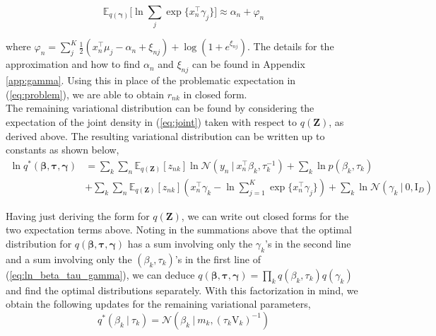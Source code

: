 \documentclass[twoside,11pt]{article}
\newcommand{\tr}{\intercal}
\newcommand{\eye}{\mathrm{I}}
\newcommand\given[1][]{\:#1\vert\:}
\newcommand{\transpose}[1]{#1^{\intercal}}
\newcommand{\kprod}{\prod\limits_{k}}
\newcommand{\nsum}{\sum\limits_{n}}
\newcommand{\ksum}{\sum\limits_{k}}
\newcommand{\boldbeta}{\boldsymbol\beta}
\newcommand{\boldgamma}{\boldsymbol\gamma}
\newcommand{\boldtau}{\boldsymbol\tau}
\newcommand{\sumexp}{\sum_{j=1}^{K} \exp \{ \transpose{x_n} \gamma_j \}}
\newcommand{\E}{\mathbb{E}}
\newcommand{\pr}[1]{p \left( #1 \right)}
\begin{document}
\begin{equation} \label{eq:bouchard_approx}
	\E_{q(\boldsymbol\gamma)}\big[\ln \sum_{j} \exp \{ x_n^{\tr} \gamma_j \} \big] \approx \alpha_n + \varphi_n
\end{equation}

where $\varphi_n =  \sum\limits_{j}^K \frac{1}{2}\left(x_n^{\tr}\mu_j - \alpha_n + \xi_{nj}\right) + \log( 1 + e^{\xi_{nj}})$. The details for the approximation and how to find $\alpha_n$ and $\xi_{nj}$ can be found in Appendix \ref{app:gamma}. Using this in place of the problematic expectation in (\ref{eq:problem}), we are able to obtain $r_{nk}$ in closed form. \\

The remaining variational distribution can be found by considering the expectation of the joint density in (\ref{eq:joint}) taken with respect to $q(\mathbf{Z})$, as derived above. The resulting variational distribution can be written up to constants as shown below,
\begin{equation} \label{eq:ln_beta_tau_gamma}
\begin{split}
	\ln q^{*}(\boldbeta, \boldtau, \boldgamma) &=  \ksum \nsum  \E_{q(\mathbf{Z})}[z_{nk}] \ln \mathcal{N} \left( y_n \given \transpose{x_n} \beta_k, \tau_{k}^{-1} \right) + \ksum \ln \pr{\beta_k, \tau_k} \\
	& + \ksum \nsum \E_{q(\mathbf{Z})}[z_{nk}] \left( \transpose{x_n} \gamma_k - \ln  \sumexp \right) + \ksum \ln \mathcal{N}(\gamma_k \given 0, \eye_D)
\end{split}
\end{equation}

Having just deriving the form for $q(\mathbf{Z})$, we can write out closed forms for the two expectation terms above. Noting in the summations above that the optimal distribution for $q(\boldbeta, \boldtau, \boldgamma)$ has a sum involving only the $\gamma_k$'s in the second line and a sum involving only the $(\beta_k, \tau_k)$'s in the first line of (\ref{eq:ln_beta_tau_gamma}), we can deduce $q(\boldbeta, \boldtau, \boldgamma) = \kprod q(\beta_k, \tau_k) q(\gamma_k)$ and find the optimal distributions separately. With this factorization in mind, we obtain the following updates for the remaining variational parameters,
\begin{equation} \label{optimal_beta_given_tau}
	q^{*}(\beta_k \given \tau_k) = \mathcal{N}\left(\beta_k \given m_k, (\tau_k \mathrm{V}_k)^{-1} \right)
\end{equation}
\end{document}
